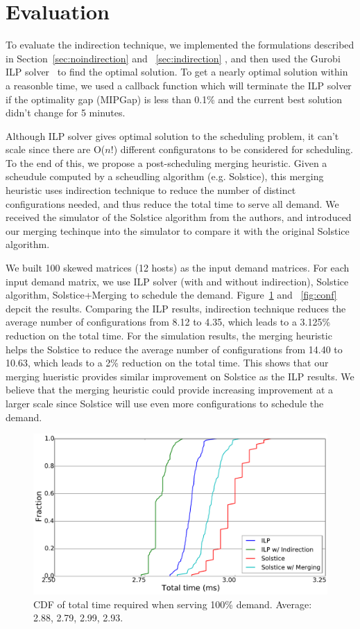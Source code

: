 \section{Evaluation}
\label{sec:goal}
To evaluate the indirection technique, we implemented the formulations described
in Section~\ref{sec:noindirection} and ~\ref{sec:indirection} , and then used the Gurobi
ILP solver~\cite{gurobi}
to find the optimal solution. To get a nearly optimal solution within a reasonble time,
we used a callback function which will terminate the ILP solver if the optimality gap (MIPGap) is
less than 0.1\% and the current best solution didn't change for 5 minutes.

Although ILP solver gives optimal solution to the scheduling problem, it can't scale since there
are O($n!$) different configuratons to be considered for scheduling. To the end of this, we
propose a post-scheduling merging heuristic. Given a scheudule computed by a scheudling algorithm
(e.g. Solstice), this merging heuristic uses indirection technique to reduce the number
of distinct configurations needed, and thus reduce the total time to serve all demand.
We received the simulator of the Solstice algorithm from the authors, and introduced
our merging techinque into the simulator to compare it with the original Solstice algorithm.

We built 100 skewed matrices (12 hosts) as the input demand matrices. For each input demand
matrix, we use ILP solver (with and without indirection), Solstice algorithm, Solstice+Merging
to schedule the demand. Figure~\ref{fig:time} and ~\ref{fig:conf} depcit the results. Comparing
the ILP results, indirection technique reduces the average number of configurations from 8.12 to
4.35, which leads to a 3.125\% reduction on the total time. For the simulation results, the
merging heuristic helps the Solstice to reduce the average number of configurations from 14.40 to
10.63, which leads to a 2\% reduction on the total time. This shows that our merging hueristic
provides similar improvement on Solstice as the ILP results. We believe that the merging heuristic
could provide increasing improvement at a larger scale since Solstice will use even more configurations
to schedule the demand.

\begin{figure}[t]
    \center
    \includegraphics[width=5in]{time.pdf}
    \caption{\label{fig:time}CDF of total time required when serving 100\% demand. Average: 2.88, 2.79, 2.99, 2.93.}
\end{figure}

